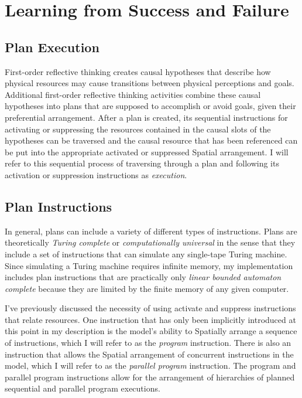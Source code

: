 \chapter{Learning from Success and Failure}
\label{chapter:learning_from_success_and_failure}

\section{Plan Execution}

First-order reflective thinking creates causal hypotheses that
describe how physical resources may cause transitions between physical
perceptions and goals.  Additional first-order reflective thinking
activities combine these causal hypotheses into plans that are
supposed to accomplish or avoid goals, given their preferential
arrangement.  After a plan is created, its sequential instructions for
activating or suppressing the resources contained in the causal slots
of the hypotheses can be traversed and the causal resource that has
been referenced can be put into the appropriate activated or
suppressed Spatial arrangement.  I will refer to this sequential
process of traversing through a plan and following its activation or
suppression instructions as \emph{execution}.

\section{Plan Instructions}

In general, plans can include a variety of different types of
instructions.  Plans are theoretically \emph{Turing complete} or
\emph{computationally universal} in the sense that they include a set
of instructions that can simulate any single-tape Turing machine.
Since simulating a Turing machine requires infinite memory, my
implementation includes plan instructions that are practically only
\emph{linear bounded automaton complete} because they are limited by
the finite memory of any given computer.

I've previously discussed the necessity of using activate and suppress
instructions that relate resources.  One instruction that has only
been implicitly introduced at this point in my description is the
model's ability to Spatially arrange a sequence of instructions, which
I will refer to as the \emph{program} instruction.  There is also an
instruction that allows the Spatial arrangement of concurrent
instructions in the model, which I will refer to as the \emph{parallel
  program} instruction.  The program and parallel program instructions
allow for the arrangement of hierarchies of planned sequential and
parallel program executions.

